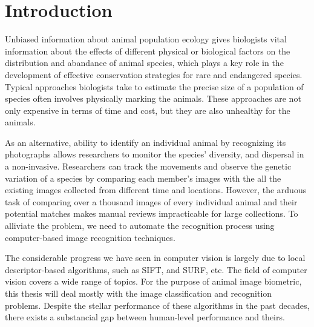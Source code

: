 
\chapter{Introduction}

Unbiased information about animal population ecology gives biologists vital information about the effects of different physical or biological factors on the distribution and abandance of animal species, which plays a key role in the development of effective conservation strategies for rare and endangered species. Typical approaches biologists take to estimate the precise size of a population of species often involves physically marking the animals. These approaches are not only expensive in terms of time and cost, but they are also unhealthy for the animals.

As an alternative, ability to identify an individual animal by recognizing its photographs allows researchers to monitor the species' diversity, and dispersal in a non-invasive. Researchers can track the movements and observe the genetic variation of a species by comparing each member's images with the all the existing images collected from different time and locations. However, the arduous task of comparing over a thousand images of every individual animal and their potential matches makes manual reviews impracticable for large collections. To alliviate the problem, we need to automate the recognition process using computer-based image recognition techniques.

The considerable progress we have seen in computer vision is largely due to local descriptor-based algorithms, such as SIFT\cite{lowe04}, and SURF\cite{surf08}, etc. The field of computer vision covers a wide range of topics. For the purpose of animal image biometric, this thesis will deal mostly with the image classification and recognition problems. Despite the stellar performance of these algorithms in the past decades, there exists a substancial gap between human-level performance and theirs.

